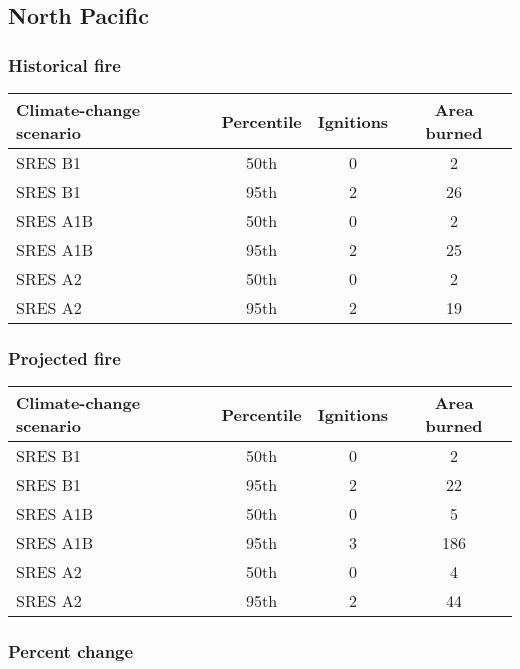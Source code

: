 \documentclass{article}\usepackage[]{graphicx}\usepackage[]{color}
\newcommand{\headcol}{\rowcolor{tableheadcolor}}
\begin{document}
\newpage
\subsection{North Pacific}
\subsubsection{Historical fire}

\begin{table}[ht]
\centering
\begin{tabular}{lccc}
  \headcol 
 \toprule
Climate-change scenario & Percentile & Ignitions & Area burned \\ 
  \midrule
SRES B1 & 50th & 0 & 2 \\ 
  SRES B1 & 95th & 2 & 26 \\ 
  SRES A1B & 50th & 0 & 2 \\ 
  SRES A1B & 95th & 2 & 25 \\ 
  SRES A2 & 50th & 0 & 2 \\ 
  SRES A2 & 95th & 2 & 19 \\ 
   \bottomrule
\end{tabular}
\end{table}


\subsubsection{Projected fire}

\begin{table}[ht]
\centering
\begin{tabular}{lccc}
  \headcol 
 \toprule
Climate-change scenario & Percentile & Ignitions & Area burned \\ 
  \midrule
SRES B1 & 50th & 0 & 2 \\ 
  SRES B1 & 95th & 2 & 22 \\ 
  SRES A1B & 50th & 0 & 5 \\ 
  SRES A1B & 95th & 3 & 186 \\ 
  SRES A2 & 50th & 0 & 4 \\ 
  SRES A2 & 95th & 2 & 44 \\ 
   \bottomrule
\end{tabular}
\end{table}


\subsubsection{Percent change}
\end{document}
